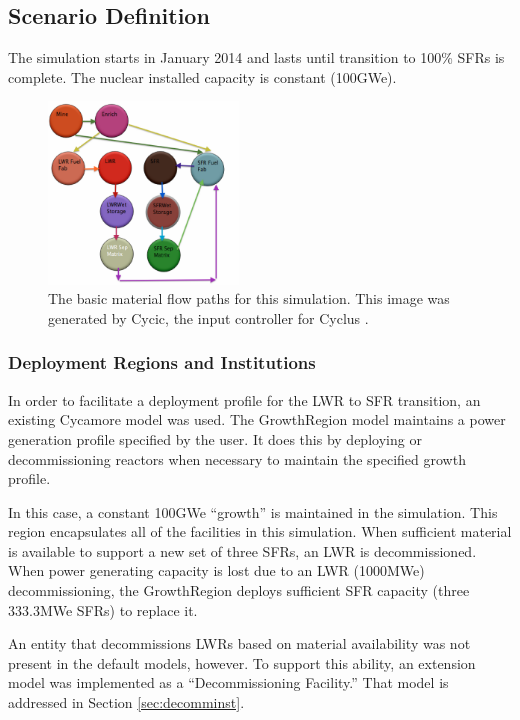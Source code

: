 \subsection{Scenario Definition}

The simulation starts in January 2014 and lasts until transition to 100\% SFRs 
is complete. The nuclear installed capacity is constant (100GWe).

\begin{figure}[htpb!]
\begin{center}
\includegraphics[width=0.45\textwidth]{cycic_img.eps}
\end{center}
\caption{The basic material flow paths for this simulation. This image was 
generated by Cycic, the input controller for Cyclus 
\cite{flannagan_cycic_2013}.}
\label{fig:cycic_img}
\end{figure}

\subsubsection{Deployment Regions and Institutions}

In order to facilitate a deployment profile for the LWR to SFR transition, an 
existing Cycamore model was used. The GrowthRegion model maintains a 
power generation profile specified by the user. It does this by deploying or 
decommissioning reactors when necessary to maintain the specified growth 
profile.  

In this case, a constant 100GWe ``growth'' is maintained in the simulation. 
This region encapsulates all of the facilities in this simulation. 
When sufficient material is available to support a new set of three SFRs, an 
LWR is decommissioned. When power generating capacity is lost due to an LWR 
(1000MWe) decommissioning, the GrowthRegion deploys sufficient SFR capacity 
(three 333.3MWe SFRs) to replace it. 

An entity that decommissions LWRs based on material availability was not 
present in the default models, however. To support this ability, an extension 
model was implemented as a ``Decommissioning Facility.'' That model is 
addressed in Section \ref{sec:decomminst}.

